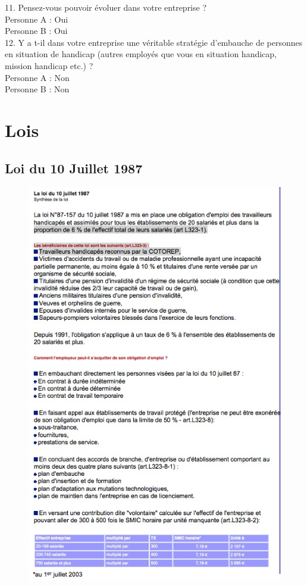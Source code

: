 11. Pensez-vous pouvoir évoluer dans votre entreprise ?\\
Personne A : Oui \\
Personne B : Oui \\


12. Y a t-il dans votre entreprise une véritable stratégie d’embauche de personnes en situation de handicap  (autres employés que vous en situation handicap, mission handicap etc.) ?\\
Personne A : Non \\
Personne B : Non \\



\section{Lois}

\subsection{Loi du 10 Juillet 1987}

\begin{figure}
\includegraphics[scale=0.9]{figures/loi_juillet_1987.jpg}
\centering
\end{figure}

